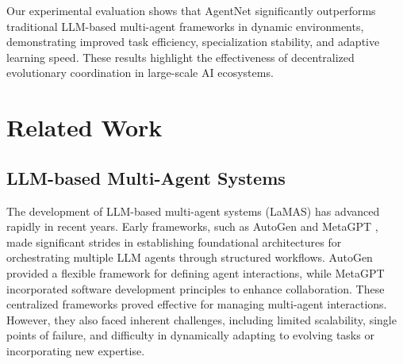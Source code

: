 \documentclass{article}
\begin{document}

Our experimental evaluation shows that AgentNet significantly outperforms traditional LLM-based multi-agent frameworks in dynamic environments, demonstrating improved task efficiency, specialization stability, and adaptive learning speed. These results highlight the effectiveness of decentralized evolutionary coordination in large-scale AI ecosystems.



\section{Related Work}
\subsection{LLM-based Multi-Agent Systems}
The development of LLM-based multi-agent systems (LaMAS) \citep{yang2024llmbasedmultiagentsystemstechniques} has advanced rapidly in recent years. Early frameworks, such as AutoGen \citep{wu2023autogenenablingnextgenllm} and MetaGPT \citep{hong2024metagptmetaprogrammingmultiagent}, made significant strides in establishing foundational architectures for orchestrating multiple LLM agents through structured workflows. AutoGen provided a flexible framework for defining agent interactions, while MetaGPT incorporated software development principles to enhance collaboration. These centralized frameworks proved effective for managing multi-agent interactions. However, they also faced inherent challenges, including limited scalability, single points of failure, and difficulty in dynamically adapting to evolving tasks or incorporating new expertise.
\end{document}
